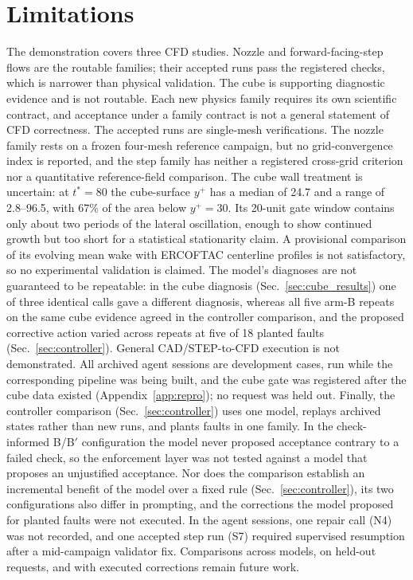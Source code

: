 \documentclass[11pt]{article}
\begin{document}
\section{Limitations}
\label{sec:limitations}

The demonstration covers three CFD studies. Nozzle and forward-facing-step
flows are the routable families; their accepted runs pass the registered
checks, which is narrower than physical validation. The cube is supporting diagnostic
evidence and is not routable. Each new physics family requires its own
scientific contract, and acceptance under a family contract is not a general
statement of CFD correctness. The accepted runs are single-mesh
verifications. The nozzle family rests on a frozen four-mesh reference
campaign, but no grid-convergence index is reported, and the step family has
neither a registered cross-grid criterion nor a quantitative reference-field
comparison. The
cube wall treatment is uncertain: at $t^*=80$ the cube-surface $y^+$ has a
median of 24.7 and a range of 2.8--96.5, with $67\%$ of the area below
$y^+=30$. Its 20-unit gate window contains only about two periods of the lateral
oscillation, enough to show continued growth but too short for a statistical
stationarity claim. A provisional comparison of its evolving mean wake with
ERCOFTAC centerline profiles is not satisfactory, so no experimental
validation is claimed. The model's diagnoses are not guaranteed to be repeatable: in the cube
diagnosis (Sec.~\ref{sec:cube_results}) one of three identical calls gave a different diagnosis, whereas all five
arm-B repeats on the same cube evidence agreed in the controller comparison, and the proposed corrective
action varied across repeats at five of 18 planted faults
(Sec.~\ref{sec:controller}). General CAD/STEP-to-CFD execution is not
demonstrated. All archived agent sessions are development cases, run while
the corresponding pipeline was being built, and the cube gate was registered
after the cube data existed (Appendix~\ref{app:repro}); no request was held
out. Finally, the controller comparison (Sec.~\ref{sec:controller}) uses one
model, replays archived states rather than new runs, and plants faults in one
family. In the check-informed B/B$'$ configuration the model never proposed
acceptance contrary to a failed check, so the enforcement layer was not
tested against a model that proposes an unjustified acceptance. Nor does
the comparison establish an incremental benefit of the model over a fixed
rule (Sec.~\ref{sec:controller}), its two configurations also differ in
prompting, and the corrections the model proposed for planted faults were not
executed. In the agent sessions, one repair call (N4) was not recorded, and one
accepted step run (S7) required supervised resumption after a mid-campaign
validator fix. Comparisons across models, on held-out
requests, and with executed corrections remain future work.
\end{document}
